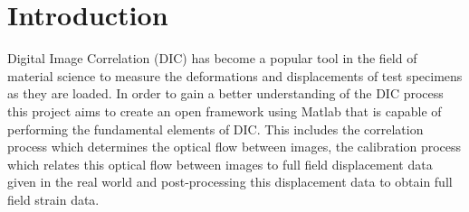 \documentclass[12pt,oneside,openany,a4paper, %
english, %
masters-t, goldenblock]{usthesis}
\begin{document}

% 







\tableofcontents
\listoffigures
\chapter{Introduction}
Digital Image Correlation (DIC) has become a popular tool in the field of material science to measure the deformations and displacements of test specimens as they are loaded. In order to gain a better understanding of the DIC process this project aims to create an open framework using Matlab that is capable of performing the fundamental elements of DIC. This includes the correlation process which determines the optical flow between images, the calibration process which relates this optical flow between images to full field displacement data given in the real world and post-processing this displacement data to obtain full field strain data. 
\end{document}
